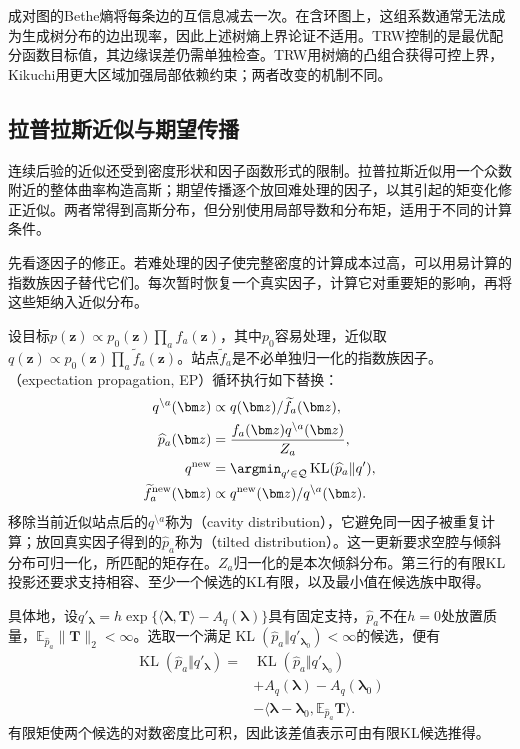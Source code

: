 成对图的Bethe熵将每条边的互信息减去一次。在含环图上，这组系数通常无法成为生成树分布的边出现率，因此上述树熵上界论证不适用。TRW控制的是最优配分函数目标值，其边缘误差仍需单独检查。TRW用树熵的凸组合获得可控上界，Kikuchi用更大区域加强局部依赖约束；两者改变的机制不同。

\subsection{拉普拉斯近似与期望传播}
\label{sec:pgm-variational-laplace-ep}
\label{sec:pgm-variational-ep}

连续后验的近似还受到密度形状和因子函数形式的限制。拉普拉斯近似用一个众数附近的整体曲率构造高斯；期望传播逐个放回难处理的因子，以其引起的矩变化修正近似。两者常得到高斯分布，但分别使用局部导数和分布矩，适用于不同的计算条件。

先看逐因子的修正。若难处理的因子使完整密度的计算成本过高，可以用易计算的指数族因子替代它们。每次暂时恢复一个真实因子，计算它对重要矩的影响，再将这些矩纳入近似分布。

设目标$p(\bm z)\propto p_0(\bm z)\prod_a f_a(\bm z)$，其中$p_0$容易处理，近似取$q(\bm z)\propto p_0(\bm z)\prod_a\widetilde f_a(\bm z)$。站点$\widetilde f_a$是不必单独归一化的指数族因子。（expectation propagation, EP）循环执行如下替换：
\begin{equation}
  \begin{aligned}
    q^{\setminus a}(\bm z)&\propto q(\bm z)/\widetilde f_a(\bm z),\\
    \widehat p_a(\bm z)&=
       \frac{f_a(\bm z)q^{\setminus a}(\bm z)}{Z_a},\\
    q^{\mathrm{new}}&=
       \argmin_{q'\in\mathcal Q}
           \operatorname{KL}(\widehat p_a\Vert q'),\\
    \widetilde f_a^{\mathrm{new}}(\bm z)&\propto
       q^{\mathrm{new}}(\bm z)/q^{\setminus a}(\bm z).
  \end{aligned}
  \label{eq:pgm-variational-ep}
\end{equation}
移除当前近似站点后的$q^{\setminus a}$称为（cavity distribution），它避免同一因子被重复计算；放回真实因子得到的$\widehat p_a$称为（tilted distribution）。这一更新要求空腔与倾斜分布可归一化，所匹配的矩存在。$Z_a$归一化的是本次倾斜分布。第三行的有限KL投影还要求支持相容、至少一个候选的KL有限，以及最小值在候选族中取得。

具体地，设$q'_{\bm{\lambda}}=h\exp\{\langle\bm{\lambda},\bm T\rangle-A_q(\bm{\lambda})\}$具有固定支持，$\widehat p_a$不在$h=0$处放置质量，$\mathbb E_{\widehat p_a}\lVert\bm T\rVert_2<\infty$。选取一个满足$\operatorname{KL}(\widehat p_a\Vert q'_{\bm{\lambda}_0})<\infty$的候选，便有
\[
  \begin{aligned}
    \operatorname{KL}(\widehat p_a\Vert q'_{\bm{\lambda}})
      ={}&\operatorname{KL}(\widehat p_a\Vert q'_{\bm{\lambda}_0})\\
       &+A_q(\bm{\lambda})-A_q(\bm{\lambda}_0)\\
       &-\langle\bm{\lambda}-\bm{\lambda}_0,
                  \mathbb E_{\widehat p_a}\bm T\rangle.
  \end{aligned}
\]
有限矩使两个候选的对数密度比可积，因此该差值表示可由有限KL候选推得。

